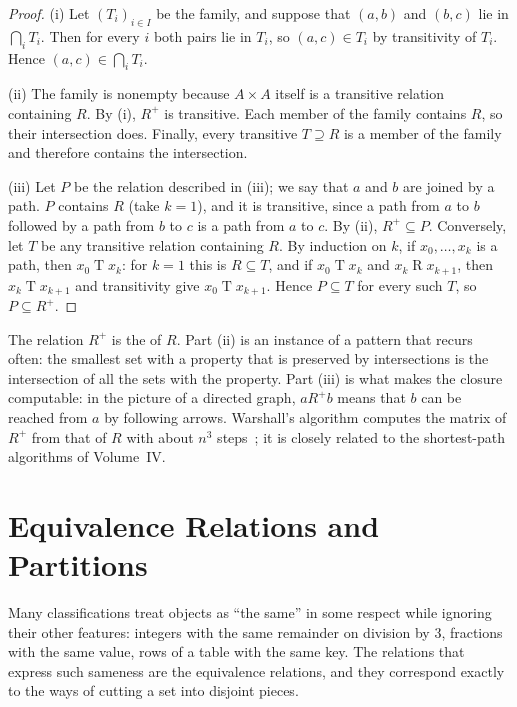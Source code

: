 \begin{proof}
(i) Let $(T_i)_{i\in I}$ be the family, and suppose that $(a,b)$ and $(b,c)$ lie in $\bigcap_iT_i$. Then for every $i$ both pairs lie in $T_i$, so $(a,c)\in T_i$ by transitivity of $T_i$. Hence $(a,c)\in\bigcap_iT_i$.

(ii) The family is nonempty because $A\times A$ itself is a transitive relation containing $R$. By (i), $R^+$ is transitive. Each member of the family contains $R$, so their intersection does. Finally, every transitive $T\supseteq R$ is a member of the family and therefore contains the intersection.

(iii) Let $P$ be the relation described in (iii); we say that $a$ and $b$ are joined by a path. $P$ contains $R$ (take $k=1$), and it is transitive, since a path from $a$ to $b$ followed by a path from $b$ to $c$ is a path from $a$ to $c$. By (ii), $R^+\subseteq P$. Conversely, let $T$ be any transitive relation containing $R$. By induction on $k$, if $x_0,\ldots,x_k$ is a path, then $x_0\mathrel{T}x_k$: for $k=1$ this is $R\subseteq T$, and if $x_0\mathrel{T}x_k$ and $x_k\mathrel{R}x_{k+1}$, then $x_k\mathrel{T}x_{k+1}$ and transitivity give $x_0\mathrel{T}x_{k+1}$. Hence $P\subseteq T$ for every such $T$, so $P\subseteq R^+$.
\end{proof}

The relation $R^+$ is the  of $R$. Part (ii) is an instance of a pattern that recurs often: the smallest set with a property that is preserved by intersections is the intersection of all the sets with the property. Part (iii) is what makes the closure computable: in the picture of a directed graph, $a\mathrel{R^+}b$ means that $b$ can be reached from $a$ by following arrows. Warshall's algorithm computes the matrix of $R^+$ from that of $R$ with about $n^3$ steps~\cite{warshall1962}; it is closely related to the shortest-path algorithms of Volume~IV.

\section{Equivalence Relations and Partitions}
\label{sec:equivalence}

Many classifications treat objects as ``the same'' in some respect while ignoring their other features: integers with the same remainder on division by $3$, fractions with the same value, rows of a table with the same key. The relations that express such sameness are the equivalence relations, and they correspond exactly to the ways of cutting a set into disjoint pieces.

